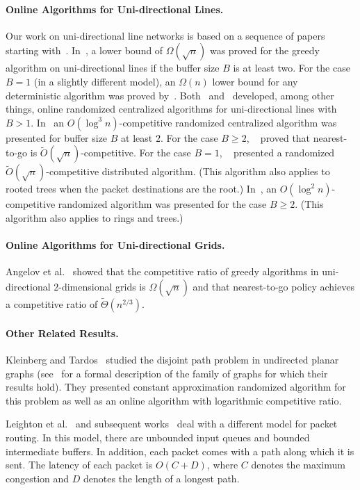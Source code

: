 \documentclass[11pt]{article}
\newenvironment{proof sketch}[1]{\noindent {\emph{Proof sketch of #1:}}}{\hfill \qed}
\begin{document}
\paragraph{Online Algorithms for Uni-directional Lines.}
Our work on uni-directional line networks is based on a
sequence of papers starting with~\cite{AKOR}.
In~\cite{AKOR}, a lower bound of $\Omega(\sqrt{n})$ was
proved for the greedy algorithm on uni-directional lines if
the buffer size $B$ is at least two. For the case $B=1$ (in
a slightly different model), an $\Omega(n)$ lower bound for
any deterministic algorithm was proved by~\cite{AZ,AKK}.
Both~\cite{AZ} and~\cite{AKK} developed, among other
things, online randomized centralized algorithms for
uni-directional lines with $B>1$. In~\cite{AKK} an
$O(\log^3 n)$-competitive randomized centralized algorithm
was presented for buffer size $B$ at least $2$. For the
case $B\geq 2$, ~\cite{AKK} proved that nearest-to-go is
$\tilde{O}(\sqrt{n})$-competitive. For the case $B=1$,
~\cite{AKK} presented a randomized
$\tilde{O}(\sqrt{n})$-competitive distributed algorithm.
(This algorithm also applies to rooted trees when the
packet destinations are the root.) In~\cite{AZ}, an
$O(\log^2 n)$-competitive randomized algorithm was
presented for the case $B\geq 2$. (This algorithm also
applies to rings and trees.)


\paragraph{Online Algorithms for Uni-directional Grids.}
Angelov et al.~\cite{AKK} showed that the competitive ratio
of greedy algorithms in uni-directional $2$-dimensional
grids is $\Omega(\sqrt{n})$ and that nearest-to-go policy
achieves a competitive ratio of $\tilde{\Theta}(n^{2/3})$.

\paragraph{Other Related Results.}
Kleinberg and Tardos~\cite{KT} studied the disjoint path problem in undirected planar
graphs (see~\cite{KT} for a formal description of the family of graphs for which
their results hold).  They presented constant approximation randomized algorithm for
this problem as well as an online algorithm with logarithmic competitive ratio.

Leighton et al.~\cite{leighton1994packet} and subsequent
works~\cite{leighton1999fast,RT, srinivasan1997constant} deal with a different model
for packet routing. In this model, there are unbounded input queues and bounded
intermediate buffers. In addition, each packet comes with a path along which it is
sent. The latency of each packet is $O(C+D)$, where $C$ denotes the maximum
congestion and $D$ denotes the length of a longest path.
\end{document}
